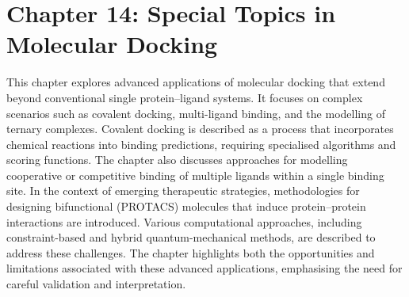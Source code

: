 \documentclass[12pt,a4paper]{article}
\begin{document}
\section*{Chapter 14: Special Topics in Molecular Docking}
This chapter explores advanced applications of molecular docking that extend beyond conventional single protein–ligand systems. It focuses on complex scenarios such as covalent docking, multi-ligand binding, and the modelling of ternary complexes. Covalent docking is described as a process that incorporates chemical reactions into binding predictions, requiring specialised algorithms and scoring functions. The chapter also discusses approaches for modelling cooperative or competitive binding of multiple ligands within a single binding site. In the context of emerging therapeutic strategies, methodologies for designing bifunctional (PROTACS) molecules that induce protein–protein interactions are introduced. Various computational approaches, including constraint-based and hybrid quantum-mechanical methods, are described to address these challenges. The chapter highlights both the opportunities and limitations associated with these advanced applications, emphasising the need for careful validation and interpretation.
\end{document}

